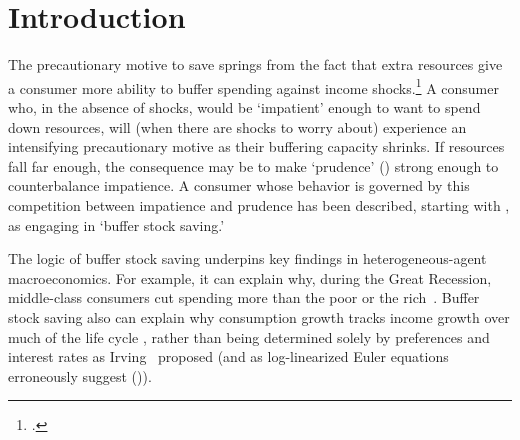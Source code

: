 \documentclass[BufferStockTheory]{subfiles}
\begin{document}
\section{Introduction}\label{sec:intro}
\setcounter{page}{0}

% 


The precautionary motive to save springs from the fact that extra resources give a consumer more ability to buffer spending against income shocks.\footnote{\cite{CarrollKimballPSPW}.}  A consumer who, in the absence of shocks, would be `impatient' enough to want to spend down resources, will (when there are shocks to worry about) experience an intensifying precautionary motive as their buffering capacity shrinks.  If resources fall far enough, the consequence may be to make `prudence' (\cite{kimball:standardra}) strong enough to counterbalance impatience.  A consumer whose behavior is governed by this competition between impatience and prudence has been described, starting with \cite{deatonLiqConstr}, as engaging in `buffer stock saving.'


The logic of buffer stock saving underpins key findings in heterogeneous-agent macroeconomics. For example, it can explain why, during the Great Recession, middle-class consumers cut spending more than the poor or the rich~\citep{kmpHandbook}. Buffer stock saving also can explain why consumption growth tracks income growth over much of the life cycle \citep{carrollBSLCPIH}, rather than being determined solely by preferences and interest rates as Irving~\cite{fisherInterestTheory} proposed (and as log-linearized Euler equations erroneously suggest (\cite{carroll:death})).  
\end{document}
